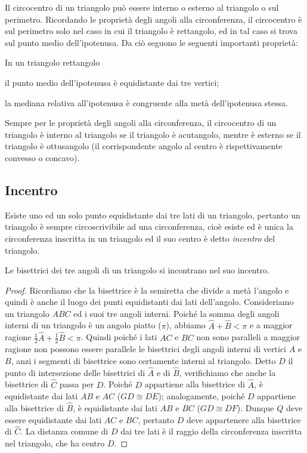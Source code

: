 \osservazione Il circocentro di un triangolo può essere interno o esterno al triangolo o sul perimetro. Ricordando le proprietà degli angoli alla circonferenza, il circocentro è sul perimetro solo nel caso in cui il triangolo è rettangolo, ed in tal caso si trova sul punto medio dell'ipotenusa.
Da ciò seguono le seguenti importanti proprietà:
\begin{teorema}
In un triangolo rettangolo
\begin{itemize*}
\item il punto medio dell'ipotenusa è equidistante dai tre vertici;
\item la mediana relativa all'ipotenusa è congruente alla metà dell'ipotenusa stessa.
\end{itemize*}
\end{teorema}

Sempre per le proprietà degli angoli alla circonferenza, il circocentro di un triangolo è interno al triangolo se il triangolo è acutangolo, mentre è esterno se il triangolo è ottusangolo (il corrispondente angolo al centro è rispettivamente convesso o concavo).

\subsection{Incentro}

Esiste uno ed un solo punto equidistante dai tre lati di un triangolo, pertanto un triangolo è sempre circoscrivibile ad una circonferenza, cioè esiste ed è unica la circonferenza inscritta in un triangolo ed il suo centro è detto \emph{incentro} del triangolo.

\begin{teorema}
Le bisettrici dei tre angoli di un triangolo si incontrano nel suo incentro.
\end{teorema}

\begin{proof}
Ricordiamo che la bisettrice è la semiretta che divide a metà l'angolo e quindi è anche il luogo dei punti equidistanti dai lati dell'angolo. Consideriamo un triangolo $ABC$ ed i suoi tre angoli interni. Poiché la somma degli angoli interni di un triangolo è un angolo piatto ($\pi$), abbiamo $\widehat{A}+\widehat{B}<\pi$ e a maggior ragione $\frac{1}{2}\widehat{A}+\frac{1}{2}\widehat{B}<\pi$. Quindi poiché i lati $AC$ e $BC$ non sono paralleli a maggior ragione non possono essere parallele le bisettrici degli angoli interni di vertici $A$ e $B$, anzi i segmenti di bisettrice sono certamente interni al triangolo. Detto $D$ il punto di intersezione delle bisettrici di $\widehat{A}$ e di $\widehat{B}$, verifichiamo che anche la bisettrice di $\widehat{C}$ passa per $D$. Poiché $D$ appartiene alla bisettrice di $\widehat{A}$, è equidistante dai lati $AB$ e $AC$ ($GD\cong DE$); analogamente, poiché $D$ appartiene alla bisettrice di $\widehat{B}$, è equidistante dai lati $AB$ e $BC$ ($GD\cong DF$). Dunque $Q$ deve essere equidistante dai lati $AC$ e $BC$, pertanto $D$ deve appartenere alla bisettrice di $\widehat{C}$. La distanza comune di $D$ dai tre lati è il raggio della circonferenza inscritta nel triangolo, che ha centro $D$.
\end{proof}

